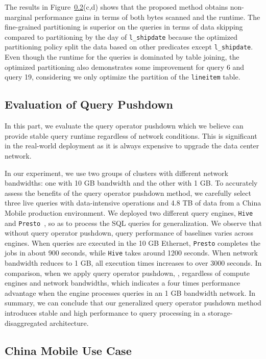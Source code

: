 
The results  in Figure~\ref{}(c,d) shows that the proposed method obtains non-marginal performance gains in terms of both bytes scanned and the runtime. The fine-grained partitioning is superior on the queries in terms of data skipping compared to partitioning by the day of \texttt{l\_shipdate} because the optimized partitioning policy split the data based on other predicates except \texttt{l\_shipdate}. 
Even though the runtime for the queries is dominated by table joining, the optimized partitioning also demonstrates some improvement for query 6 and query 19, considering we only optimize the partition of the \texttt{lineitem} table. 




\subsection{Evaluation of Query Pushdown}
In this part, we evaluate the query operator pushdown  which we believe can provide stable query runtime regardless of network conditions. This is significant in the real-world deployment as it is  always expensive to upgrade the data center network. 




In our experiment, we use two groups of clusters with different network bandwidths: one with 10 GB bandwidth and the other with 1 GB. To accurately assess the benefits of the query operator pushdown method, we carefully select three live queries with data-intensive operations and 4.8 TB of data from a China Mobile production environment. We deployed two different query engines, \texttt{Hive}~\cite{} and \texttt{Presto}~\cite{}, so as to process the SQL queries for generalization.
We observe that  without query operator pushdown, query performance of baselines varies  across engines. When  queries are executed in the 10 GB Ethernet, \texttt{Presto} completes the jobs in about 900 seconds, while \texttt{Hive} takes around 1200 seconds. When network bandwidth reduces to 1 GB, all execution times increases to over 3000 seconds.
 In comparison, when we apply query operator pushdown, , regardless of compute engines and network bandwidths, which indicates a four times performance advantage when the engine processes queries in an 1 GB bandwidth network.  In summary, we can conclude that our generalized query operator pushdown method introduces stable and high performance to query processing in a storage-disaggregated architecture. 







\subsection{China Mobile Use Case}
